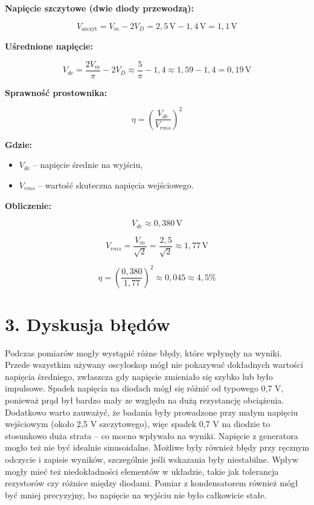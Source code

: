 \documentclass[a4paper,12pt]{article}
\begin{document}
\textbf{Napięcie szczytowe (dwie diody przewodzą):}

\[
V_{\text{szczyt}} = V_m - 2V_D = 2{,}5\,\text{V} - 1{,}4\,\text{V} = 1{,}1\,\text{V}
\]

\textbf{Uśrednione napięcie:}

\[
V_{dc} = \frac{2 V_m}{\pi} - 2 V_D \approx \frac{5}{\pi} - 1{,}4 \approx 1{,}59 - 1{,}4 = 0{,}19\,\text{V}
\]

\textbf{Sprawność prostownika:}

\[
\eta = \left( \frac{V_{dc}}{V_{rms}} \right)^2
\]

\textbf{Gdzie:}

\begin{itemize}
    \item $V_{dc}$ – napięcie średnie na wyjściu,
    \item $V_{rms}$ – wartość skuteczna napięcia wejściowego.
\end{itemize}

\textbf{Obliczenie:}

\[
V_{dc} \approx 0{,}380\,\text{V}
\]

\[
V_{rms} = \frac{V_m}{\sqrt{2}} = \frac{2{,}5}{\sqrt{2}} \approx 1{,}77\,\text{V}
\]

\[
\eta = \left( \frac{0{,}380}{1{,}77} \right)^2 \approx 0{,}045 \approx 4{,}5\%
\]
\section*{3. Dyskusja błędów}

Podczas pomiarów mogły wystąpić różne błędy, które wpłynęły na wyniki. Przede wszystkim używany oscyloskop mógł nie pokazywać dokładnych wartości napięcia średniego, zwłaszcza gdy napięcie zmieniało się szybko lub było impulsowe. Spadek napięcia na diodach mógł się różnić od typowego 0,7 V, ponieważ prąd był bardzo mały ze względu na dużą rezystancję obciążenia. Dodatkowo warto zauważyć, że badania były prowadzone przy małym napięciu wejściowym (około 2,5 V szczytowego), więc spadek 0,7 V na diodzie to stosunkowo duża strata – co mocno wpływało na wyniki. Napięcie z generatora mogło też nie być idealnie sinusoidalne.
Możliwe były również błędy przy ręcznym odczycie i zapisie wyników, szczególnie jeśli wskazania były niestabilne. Wpływ mogły mieć też niedokładności elementów w układzie, takie jak tolerancja rezystorów czy różnice między diodami. Pomiar z kondensatorem również mógł być mniej precyzyjny, bo napięcie na wyjściu nie było całkowicie stałe.
\end{document}
